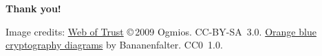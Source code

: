 \documentclass[
mode=present,
paper=smartboard,
size=20pt,
]{powerdot}
\begin{document}
\begin{slide}[toc=]{}
\centering

\vfill

{\huge \textbf{Thank you!}}

\vfill

\tiny Image credits:
\href{https://commons.wikimedia.org/wiki/File:Web_of_Trust.svg}{Web of
  Trust} \copyright\,2009 Ogmios. CC-BY-SA~3.0.
\href{https://commons.wikimedia.org/wiki/Category:Orange_blue_cryptography_diagrams}{Orange
  blue cryptography diagrams} by Bananenfalter. CC0~1.0.
\end{slide}
\end{document}
